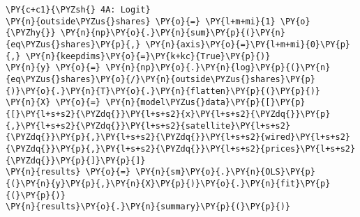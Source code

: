     \begin{tcolorbox}[breakable, size=fbox, boxrule=1pt, pad at break*=1mm,colback=cellbackground, colframe=cellborder]
\begin{Verbatim}[commandchars=\\\{\}]
\PY{c+c1}{\PYZsh{} 4A: Logit}
\PY{n}{outside\PYZus{}shares} \PY{o}{=} \PY{l+m+mi}{1} \PY{o}{\PYZhy{}} \PY{n}{np}\PY{o}{.}\PY{n}{sum}\PY{p}{(}\PY{n}{eq\PYZus{}shares}\PY{p}{,} \PY{n}{axis}\PY{o}{=}\PY{l+m+mi}{0}\PY{p}{,} \PY{n}{keepdims}\PY{o}{=}\PY{k+kc}{True}\PY{p}{)}
\PY{n}{y} \PY{o}{=} \PY{n}{np}\PY{o}{.}\PY{n}{log}\PY{p}{(}\PY{n}{eq\PYZus{}shares}\PY{o}{/}\PY{n}{outside\PYZus{}shares}\PY{p}{)}\PY{o}{.}\PY{n}{T}\PY{o}{.}\PY{n}{flatten}\PY{p}{(}\PY{p}{)}
\PY{n}{X} \PY{o}{=} \PY{n}{model\PYZus{}data}\PY{p}{[}\PY{p}{[}\PY{l+s+s2}{\PYZdq{}}\PY{l+s+s2}{x}\PY{l+s+s2}{\PYZdq{}}\PY{p}{,}\PY{l+s+s2}{\PYZdq{}}\PY{l+s+s2}{satellite}\PY{l+s+s2}{\PYZdq{}}\PY{p}{,}\PY{l+s+s2}{\PYZdq{}}\PY{l+s+s2}{wired}\PY{l+s+s2}{\PYZdq{}}\PY{p}{,}\PY{l+s+s2}{\PYZdq{}}\PY{l+s+s2}{prices}\PY{l+s+s2}{\PYZdq{}}\PY{p}{]}\PY{p}{]}
\PY{n}{results} \PY{o}{=} \PY{n}{sm}\PY{o}{.}\PY{n}{OLS}\PY{p}{(}\PY{n}{y}\PY{p}{,}\PY{n}{X}\PY{p}{)}\PY{o}{.}\PY{n}{fit}\PY{p}{(}\PY{p}{)}
\PY{n}{results}\PY{o}{.}\PY{n}{summary}\PY{p}{(}\PY{p}{)}
\end{Verbatim}
\end{tcolorbox}

